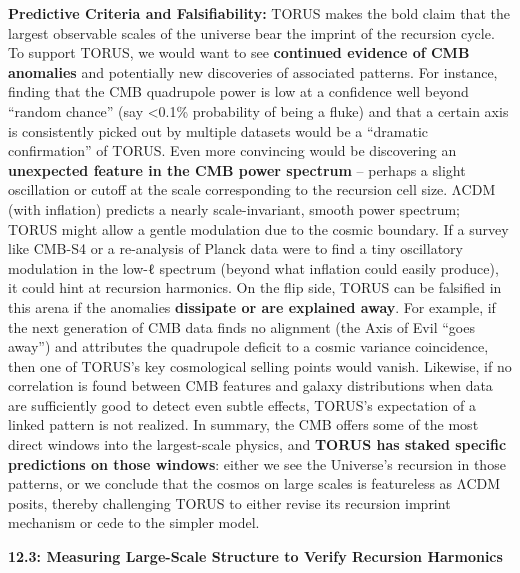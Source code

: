 \textbf{Predictive Criteria and Falsifiability:} TORUS makes the bold
claim that the largest observable scales of the universe bear the
imprint of the recursion cycle. To support TORUS, we would want to see
\textbf{continued evidence of CMB anomalies} and potentially new
discoveries of associated patterns. For instance, finding that the CMB
quadrupole power is low at a confidence well beyond ``random chance''
(say \textless{}0.1\% probability of being a fluke) and that a certain
axis is consistently picked out by multiple datasets would be a
``dramatic confirmation'' of TORUS​. Even more convincing would be
discovering an \textbf{unexpected feature in the CMB power spectrum} --
perhaps a slight oscillation or cutoff at the scale corresponding to the
recursion cell size. ΛCDM (with inflation) predicts a nearly
scale-invariant, smooth power spectrum; TORUS might allow a gentle
modulation due to the cosmic boundary. If a survey like CMB-S4 or a
re-analysis of Planck data were to find a tiny oscillatory modulation in
the low-ℓ spectrum (beyond what inflation could easily produce), it
could hint at recursion harmonics. On the flip side, TORUS can be
falsified in this arena if the anomalies \textbf{dissipate or are
explained away}. For example, if the next generation of CMB data finds
no alignment (the Axis of Evil ``goes away'') and attributes the
quadrupole deficit to a cosmic variance coincidence, then one of TORUS's
key cosmological selling points would vanish. Likewise, if no
correlation is found between CMB features and galaxy distributions when
data are sufficiently good to detect even subtle effects, TORUS's
expectation of a linked pattern is not realized. In summary, the CMB
offers some of the most direct windows into the largest-scale physics,
and \textbf{TORUS has staked specific predictions on those windows}:
either we see the Universe's recursion in those patterns, or we conclude
that the cosmos on large scales is featureless as ΛCDM posits, thereby
challenging TORUS to either revise its recursion imprint mechanism or
cede to the simpler model.

\textbf{12.3: Measuring Large-Scale Structure to Verify Recursion
Harmonics}

